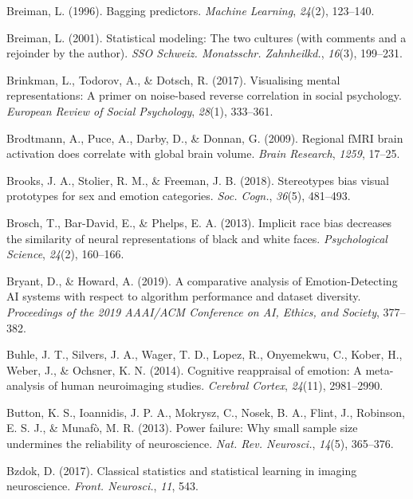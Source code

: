 \documentclass[12pt,american,a4paper,oneside,]{memoir} %
\begin{document}
\leavevmode\hypertarget{ref-breiman1996bagging}{}%
Breiman, L. (1996). Bagging predictors. \emph{Machine Learning}, \emph{24}(2), 123--140.

\leavevmode\hypertarget{ref-Breiman2001-lf}{}%
Breiman, L. (2001). Statistical modeling: The two cultures (with comments and a rejoinder by the author). \emph{SSO Schweiz. Monatsschr. Zahnheilkd.}, \emph{16}(3), 199--231.

\leavevmode\hypertarget{ref-Brinkman2017-hg}{}%
Brinkman, L., Todorov, A., \& Dotsch, R. (2017). Visualising mental representations: A primer on noise-based reverse correlation in social psychology. \emph{European Review of Social Psychology}, \emph{28}(1), 333--361.

\leavevmode\hypertarget{ref-brodtmann2009regional}{}%
Brodtmann, A., Puce, A., Darby, D., \& Donnan, G. (2009). Regional fMRI brain activation does correlate with global brain volume. \emph{Brain Research}, \emph{1259}, 17--25.

\leavevmode\hypertarget{ref-Brooks2018-ao}{}%
Brooks, J. A., Stolier, R. M., \& Freeman, J. B. (2018). Stereotypes bias visual prototypes for sex and emotion categories. \emph{Soc. Cogn.}, \emph{36}(5), 481--493.

\leavevmode\hypertarget{ref-brosch2013implicit}{}%
Brosch, T., Bar-David, E., \& Phelps, E. A. (2013). Implicit race bias decreases the similarity of neural representations of black and white faces. \emph{Psychological Science}, \emph{24}(2), 160--166.

\leavevmode\hypertarget{ref-Bryant2019-sg}{}%
Bryant, D., \& Howard, A. (2019). A comparative analysis of Emotion-Detecting AI systems with respect to algorithm performance and dataset diversity. \emph{Proceedings of the 2019 AAAI/ACM Conference on AI, Ethics, and Society}, 377--382.

\leavevmode\hypertarget{ref-buhle2014cognitive}{}%
Buhle, J. T., Silvers, J. A., Wager, T. D., Lopez, R., Onyemekwu, C., Kober, H., Weber, J., \& Ochsner, K. N. (2014). Cognitive reappraisal of emotion: A meta-analysis of human neuroimaging studies. \emph{Cerebral Cortex}, \emph{24}(11), 2981--2990.

\leavevmode\hypertarget{ref-Button2013-zu}{}%
Button, K. S., Ioannidis, J. P. A., Mokrysz, C., Nosek, B. A., Flint, J., Robinson, E. S. J., \& Munafò, M. R. (2013). Power failure: Why small sample size undermines the reliability of neuroscience. \emph{Nat. Rev. Neurosci.}, \emph{14}(5), 365--376.

\leavevmode\hypertarget{ref-Bzdok2017-li}{}%
Bzdok, D. (2017). Classical statistics and statistical learning in imaging neuroscience. \emph{Front. Neurosci.}, \emph{11}, 543.
\end{document}
